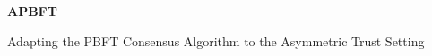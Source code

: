 {%


\newcommand{\thesistitle}{APBFT}
\newcommand{\thesisauthor}{Bernhard Jonathan}
\newcommand{\thesisleiter}{Christian Cachin}
\newcommand{\thesisasst}{Juan Villacis \& Michael Senn}
\newcommand{\thesissubtitle}{Adapting the PBFT Consensus Algorithm to the Asymmetric Trust Setting}
\newcommand{\thesisdate}{August 2025}




\usepackage[ colorlinks=true, urlcolor=black, linkcolor=black,
			citecolor=black, bookmarksnumbered=true, bookmarks=true,
			plainpages=false,
			pdftitle={\thesistitle}, pdfauthor={\thesisauthor},
			pdfsubject={\thesissubtitle}, pdfpagelabels]{hyperref}

\newcommand{\hrref}[2]{\hyperref}


\pagestyle{plain}


\begin{titlepage}  
  \begin{center}  
  
  \begin{figure}[t]  
  \vspace*{-2cm}        %
  \vspace{0.4in}     
  \end{figure}

    \thispagestyle{empty}
    
    {\bfseries\Huge \thesistitle \par
    \Large \vspace{0.1in} \thesissubtitle \par}


\end{center}
\end{titlepage}}
